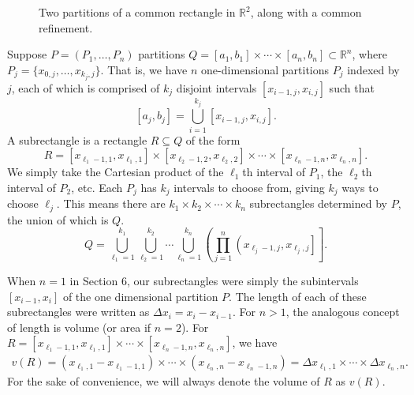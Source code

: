 \documentclass{article}
\newcommand{\R}{\mathbb{R}}
\newcommand{\brk}[1]{ \left(#1\right] }
\newcommand{\paren}[1]{ \left(#1\right) }
\theoremstyle{definition}
\begin{document}
\begin{figure}[h]
		\caption{Two partitions of a common rectangle in $ \R^2 $, along with a common refinement.}
	\end{figure}

Suppose $ P = (P_1,\ldots, P_n) $ partitions $ Q=[a_1,b_1]\times \cdots \times [a_n,b_n]\subset \R^n $, where $ P_j=\{x_{0,j},\ldots , x_{k_j,j}\} $. That is, we have $ n $ one-dimensional partitions $ P_j $ indexed by $ j $, each of which is comprised of $ k_j $ disjoint intervals $ [x_{i-1,j},x_{i,j}] $ such that 
$$ [a_j,b_j]= \bigcup_{i=1}^{k_j}[x_{i-1,j},x_{i,j}] .$$ A subrectangle is a rectangle $ R\subseteq Q $ of the form 
$$ R=[x_{\ell_1-1,1},x_{\ell_1,1}]\times [x_{\ell_2-1,2},x_{\ell_2,2}] \times \cdots \times [x_{\ell_n-1,n},x_{\ell_n,n}].$$ We simply take the Cartesian product of the $ \ell_1 $th interval of $ P_1 $, the $ \ell_2 $th interval of $ P_2 $, etc. Each $ P_j $ has $ k_j $ intervals to choose from, giving $ k_j $ ways to choose $ \ell_j $. This means there are $k_1\times k_2\times \cdots \times k_n $ subrectangles determined by $ P $, the union of which is $ Q $. 
$$ Q=\bigcup_{\ell _1 = 1}^{k_1}\bigcup_{\ell _2 = 1}^{k_2}\cdots \bigcup_{\ell _n = 1}^{k_n}\brk{\prod_{j=1}^{n}\brk{x_{\ell_j-1,j},x_{\ell_j,j}}}.$$


When $ n=1 $ in Section 6, our subrectangles were simply the subintervals $ [x_{i-1},x_i] $ of the one dimensional partition $ P $. The length of each of these subrectangles were written as $ \Delta x_i = x_{i}-x_{i-1} $. For $ n > 1 $, the analogous concept of length is volume (or area if $ n = 2 $). For $ R = [x_{\ell_1-1,1},x_{\ell_1,1}]\times \cdots \times [x_{\ell_n-1,n},x_{\ell_n,n}]$, we have 
\begin{align*}
	v(R) = \paren{x_{\ell_1,1} - x_{\ell_1-1,1}}\times \cdots \times \paren{x_{\ell_n,n} - x_{\ell_n-1,n}}
	= \Delta x_{\ell_1,1}\times \cdots \times \Delta x_{\ell_n,n}.
\end{align*}
For the sake of convenience, we will always denote the volume of $ R $ as $ v(R) $.
\end{document}
